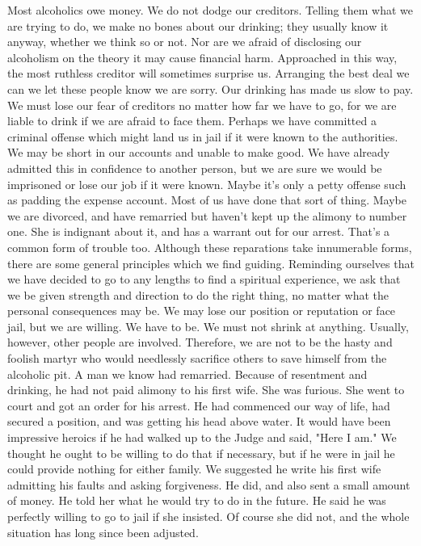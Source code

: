 \begin{biblechapter}
Most alcoholics owe money.  We do not dodge our creditors.  Telling them what we are trying to do, we make no bones about our drinking; they usually know it anyway, whether we think so or not.  Nor are we afraid of disclosing our alcoholism on the theory it may cause financial harm.  Approached in this way, the most ruthless creditor will sometimes surprise us.  Arranging the best deal we can we let these people know we are sorry.  Our drinking has made us slow to pay.  We must lose our fear of creditors no matter how far we have to go, for we are liable to drink if we are afraid to face them.
Perhaps we have committed a criminal offense which might land us in jail if it were known to the authorities.  We may be short in our accounts and unable to make good.  We have already admitted this in confidence to another person, but we are sure we would be imprisoned or lose our job if it were known.  Maybe it's only a petty offense such as padding the expense account.  Most of us have done that sort of thing.  Maybe we are divorced, and have remarried but haven't kept up the alimony to number one.  She is indignant about it, and has a warrant out for our arrest.  That's a common form of trouble too.
Although these reparations take innumerable forms, there are some general principles which we find guiding.  Reminding ourselves that we have decided to go to any lengths to find a spiritual experience, we ask that we be given strength and direction to do the right thing, no matter what the personal consequences may be.  We may lose our position or reputation or face jail, but we are willing.  We have to be.  We must not shrink at anything.
Usually, however, other people are involved.  Therefore, we are not to be the hasty and foolish martyr who would needlessly sacrifice others to save himself from the alcoholic pit.  A man we know had remarried.  Because of resentment and drinking, he had not paid alimony to his first wife.  She was furious.  She went to court and got an order for his arrest.  He had commenced our way of life, had secured a position, and was getting his head above water.  It would have been impressive heroics if he had walked up to the Judge and said, "Here I am."
We thought he ought to be willing to do that if necessary, but if he were in jail he could provide nothing for either family.  We suggested he write his first wife admitting his faults and asking forgiveness.  He did, and also sent a small amount of money.  He told her what he would try to do in the future.  He said he was perfectly willing to go to jail if she insisted.  Of course she did not, and the whole situation has long since been adjusted.

\end{biblechapter}
